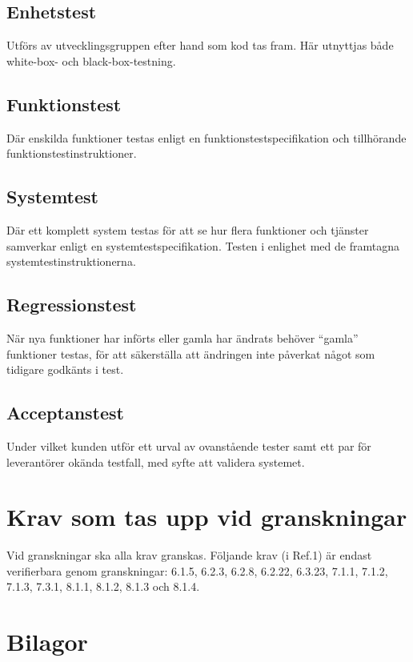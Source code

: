 \documentclass[a4paper]{article}
\begin{document}
\subsection{Enhetstest}

Utförs av utvecklingsgruppen efter hand som kod tas fram. Här utnyttjas både white-box- och black-box-testning.

\subsection{Funktionstest}

Där enskilda funktioner testas enligt en funktionstestspecifikation och tillhörande funktionstestinstruktioner. 

\subsection{Systemtest}

Där ett komplett system testas för att se hur flera funktioner och tjänster samverkar enligt en systemtestspecifikation. Testen i enlighet med de framtagna systemtestinstruktionerna. 

\subsection{Regressionstest}

När nya funktioner har införts eller gamla har ändrats behöver ``gamla'' funktioner testas, för att säkerställa att ändringen inte påverkat något som tidigare godkänts i test.

\subsection{Acceptanstest}

Under vilket kunden utför ett urval av ovanstående tester samt ett par för leverantörer okända testfall, med syfte att validera systemet.

\section{Krav som tas upp vid granskningar}


Vid granskningar ska alla krav granskas.
Följande krav (i Ref.1) är endast verifierbara genom granskningar: 6.1.5, 6.2.3, 6.2.8, 6.2.22, 6.3.23, 7.1.1, 7.1.2, 7.1.3, 7.3.1, 8.1.1, 8.1.2, 8.1.3 och 8.1.4.

\section{Bilagor}
\end{document}
